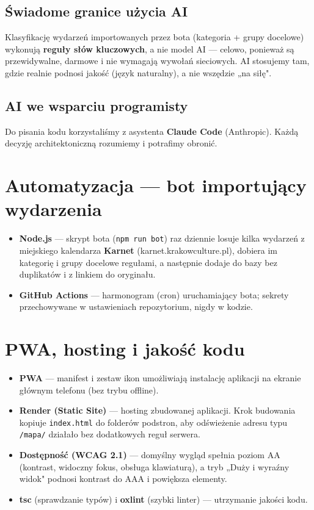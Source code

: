 \documentclass[11pt,a4paper]{article}
\begin{document}
\subsection{Świadome granice użycia AI}
Klasyfikację wydarzeń importowanych przez bota (kategoria + grupy docelowe) wykonują
\textbf{reguły słów kluczowych}, a nie model AI --- celowo, ponieważ są przewidywalne, darmowe
i nie wymagają wywołań sieciowych. AI stosujemy tam, gdzie realnie podnosi jakość (język naturalny),
a nie wszędzie „na siłę".

\subsection{AI we wsparciu programisty}
Do pisania kodu korzystaliśmy z asystenta \textbf{Claude Code} (Anthropic). Każdą decyzję
architektoniczną rozumiemy i potrafimy obronić.

\section{Automatyzacja --- bot importujący wydarzenia}

\begin{itemize}
  \item \textbf{Node.js} --- skrypt bota (\texttt{npm run bot}) raz dziennie losuje kilka wydarzeń
        z miejskiego kalendarza \textbf{Karnet} (karnet.krakowculture.pl), dobiera im kategorię
        i grupy docelowe regułami, a następnie dodaje do bazy bez duplikatów i z linkiem do oryginału.
  \item \textbf{GitHub Actions} --- harmonogram (cron) uruchamiający bota; sekrety przechowywane
        w ustawieniach repozytorium, nigdy w kodzie.
\end{itemize}

\section{PWA, hosting i jakość kodu}

\begin{itemize}
  \item \textbf{PWA} --- manifest i zestaw ikon umożliwiają instalację aplikacji na ekranie głównym
        telefonu (bez trybu offline).
  \item \textbf{Render (Static Site)} --- hosting zbudowanej aplikacji. Krok budowania kopiuje
        \texttt{index.html} do folderów podstron, aby odświeżenie adresu typu \texttt{/mapa/}
        działało bez dodatkowych reguł serwera.
  \item \textbf{Dostępność (WCAG 2.1)} --- domyślny wygląd spełnia poziom AA (kontrast, widoczny fokus,
        obsługa klawiaturą), a tryb „Duży i wyraźny widok" podnosi kontrast do AAA i powiększa elementy.
  \item \textbf{tsc} (sprawdzanie typów) i \textbf{oxlint} (szybki linter) --- utrzymanie jakości kodu.
\end{itemize}
\end{document}
